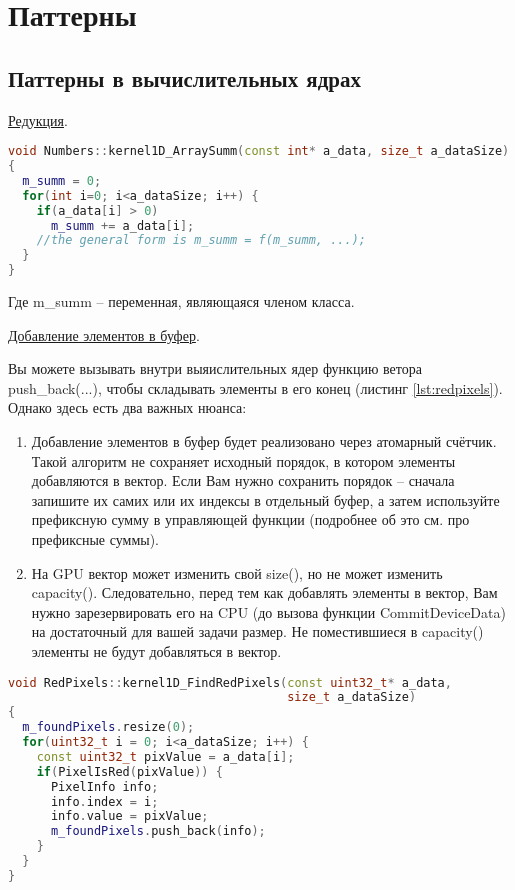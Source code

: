 \documentclass[11pt,fleqn,english,russian]{report} %
\begin{document}
\chapter{Паттерны}\label{patterns}

\section{Паттерны в вычислительных ядрах}

\noindent\underline{Редукция}.

\begin{lstlisting}[language=C++, 
	               caption=паттерн редукции, 
	               label=lst:reduction]		
void Numbers::kernel1D_ArraySumm(const int* a_data, size_t a_dataSize)
{
  m_summ = 0; 
  for(int i=0; i<a_dataSize; i++) {
    if(a_data[i] > 0)
      m_summ += a_data[i];
    //the general form is m_summ = f(m_summ, ...); 
  }
}
\end{lstlisting}

Где m\_summ -- переменная, являющаяся членом класса.

\noindent\underline{Добавление элементов в буфер}.

Вы можете вызывать внутри выяислительных ядер функцию ветора push\_back(...), чтобы складывать элементы в его конец (листинг \ref{lst:redpixels}). Однако здесь есть два важных нюанса:

\begin{enumerate}
\item Добавление элементов в буфер будет реализовано через атомарный счётчик. Такой алгоритм не сохраняет исходный порядок, в котором элементы добавляются в вектор. Если Вам нужно сохранить порядок -- сначала запишите их самих или их индексы в отдельный буфер, а затем используйте префиксную сумму в управляющей функции (подробнее об это см. про префиксные суммы).
\item На GPU вектор может изменить свой size(), но не может изменить capacity(). Следовательно, перед тем как добавлять элементы в вектор, Вам нужно зарезервировать его на CPU (до вызова функции CommitDeviceData) на достаточный для вашей задачи размер. Не поместившиеся в capacity() элементы не будут добавляться в вектор.
\end{enumerate}

\begin{lstlisting}[language=C++, 
	               caption=добавление элементов в конец буфера, 
	               label=lst:redpixels]	
void RedPixels::kernel1D_FindRedPixels(const uint32_t* a_data, 
                                       size_t a_dataSize)
{
  m_foundPixels.resize(0);
  for(uint32_t i = 0; i<a_dataSize; i++) {
    const uint32_t pixValue = a_data[i];
    if(PixelIsRed(pixValue)) {
      PixelInfo info;
      info.index = i;
      info.value = pixValue;
      m_foundPixels.push_back(info);
    }
  }
}
\end{lstlisting}
\end{document}
